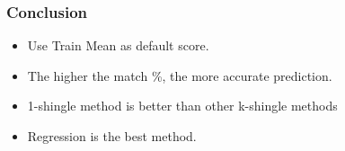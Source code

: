 \documentclass[11pt]{beamer}
\begin{document}
\begin{frame}
\frametitle{Conclusion}
	
	\begin{itemize}
		[square]
		\item Use Train Mean as default score.
		\item The higher the match \%, the more accurate prediction.
		\item 1-shingle method is better than other k-shingle methods
		\item Regression is the best method.
	\end{itemize}		
	

	


\end{frame}
\end{document}
